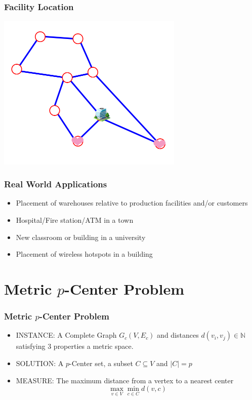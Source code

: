 \documentclass[12pt]{beamer}
\begin{document}
\begin{frame}
\frametitle{Facility Location}
\begin{center}
\includegraphics[height=75mm]{Images/intro5}\\
\end{center}
\end{frame}

\begin{frame}
\frametitle{Real World Applications}
\begin{itemize}
\item Placement of warehouses relative to production facilities and/or customers
\item Hospital/Fire station/ATM in a town
\item New classroom or building in a university
\item Placement of wireless hotspots in a building
\end{itemize}
\end{frame}

\section{Metric $p$-Center Problem}
\begin{frame}
\frametitle{Metric $p$-Center Problem}
\begin{itemize}
\item INSTANCE: A Complete Graph $G_c(V,E_c)$ and distances $d(v_i,v_j) \in \mathbb{N}$ satisfying 3 properties a metric space.
\item SOLUTION: A $p$-Center set, a subset $C \subseteq V$ and $\lvert C\rvert = p$
\item MEASURE: The maximum distance from a vertex to a nearest center 
$$
\max_{v \in V} \min_{c \in C} d(v,c)
$$
\end{itemize}
\end{frame}
\end{document}

